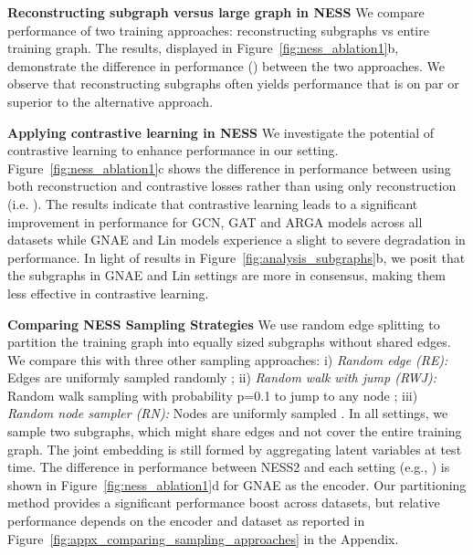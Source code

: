 \documentclass{article}
\begin{document}
\textbf{Reconstructing subgraph versus large graph in NESS}
We compare performance of two training approaches: reconstructing subgraphs vs entire training graph. The results, displayed in Figure~\ref{fig:ness_ablation1}b, demonstrate the difference in performance () between the two approaches. We observe that reconstructing subgraphs often yields performance that is on par or superior to the alternative approach. 

\textbf{Applying contrastive learning in NESS}
We investigate the potential of contrastive learning to enhance performance in our setting. Figure~\ref{fig:ness_ablation1}c shows the difference in performance between using both reconstruction and contrastive losses rather than using only reconstruction (i.e. ). The results indicate that contrastive learning leads to a significant improvement in performance for GCN, GAT and ARGA models across all datasets while GNAE and Lin models experience a slight to severe degradation in performance. In light of results in Figure~\ref{fig:analysis_subgraphs}b, we posit that the subgraphs in GNAE and Lin settings are more in consensus, making them less effective in contrastive learning.


\textbf{Comparing NESS Sampling Strategies}
We use random edge splitting to partition the training graph into equally sized subgraphs without shared edges. We compare this with three other sampling approaches: i) \textit{Random edge (RE):} Edges are uniformly sampled randomly \citep{krishnamurthy2005reducing}; ii) \textit{Random walk with jump (RWJ):} Random walk sampling with probability p=0.1 to jump to any node \citep{leskovec2006sampling}; iii) \textit{Random node sampler (RN):} Nodes are uniformly sampled \citep{stumpf2005subnets}. In all settings, we sample two subgraphs, which might share edges and not cover the entire training graph. The joint embedding is still formed by aggregating latent variables at test time. The difference in performance between NESS2 and each setting (e.g., ) is shown in Figure~\ref{fig:ness_ablation1}d for GNAE as the encoder. Our partitioning method provides a significant performance boost across datasets, but relative performance depends on the encoder and dataset as reported in Figure~\ref{fig:appx_comparing_sampling_approaches} in the Appendix.
\end{document}
